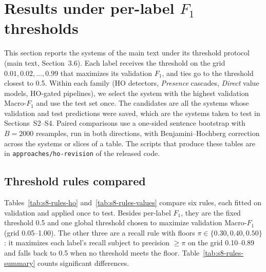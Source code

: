 \section{Results under per-label $F_1$ thresholds}
\label{sec:per-label-f1}

This section reports the systems of the main text under its threshold protocol (main text, Section~3.6). Each label receives the threshold on the grid $0.01,0.02,\dots,0.99$ that maximizes its validation $F_1$, and ties go to the threshold closest to 0.5. Within each family (HO detectors, \emph{Presence} cascades, \emph{Direct} value models, HO-gated pipelines), we select the system with the highest validation Macro-$F_1$ and use the test set once. The candidates are all the systems whose validation and test predictions were saved, which are the systems taken to test in Sections~S2--S4. Paired comparisons use a one-sided sentence bootstrap with $B=2000$ resamples, run in both directions, with Benjamini--Hochberg correction across the systems or slices of a table. The scripts that produce these tables are in \texttt{approaches/ho-revision} of the released code.

\subsection{Threshold rules compared}
\label{sec:s8-rules}

Tables~\ref{tab:s8-rules-ho} and~\ref{tab:s8-rules-values} compare six rules, each fitted on validation and applied once to test. Besides per-label $F_1$, they are the fixed threshold 0.5 and one global threshold chosen to maximize validation Macro-$F_1$ (grid 0.05--1.00). The other three are a recall rule with floors $\pi\in\{0.30,0.40,0.50\}$: it maximizes each label's recall subject to precision $\ge\pi$ on the grid 0.10--0.89 and falls back to 0.5 when no threshold meets the floor. Table~\ref{tab:s8-rules-summary} counts significant differences.

